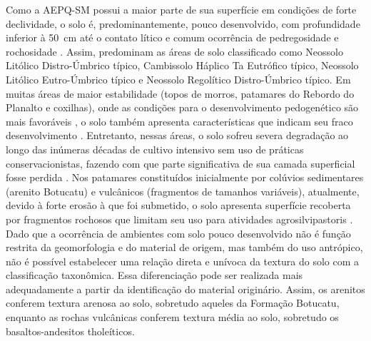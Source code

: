 \documentclass[final]{article}
\begin{document}

Como a AEPQ-SM possui a maior parte de sua superfície em condições de forte declividade, o solo é, predominantemente, pouco desenvolvido, com profundidade inferior à 50~cm até o contato lítico e comum ocorrência de pedregosidade e rochosidade \cite{Miguel2010}. Assim, predominam as áreas de solo classificado como Neossolo Litólico Distro-Úmbrico típico, Cambissolo Háplico Ta Eutrófico típico, Neossolo Litólico Eutro-Úmbrico típico e Neossolo Regolítico Distro-Úmbrico típico. Em muitas áreas de maior estabilidade (topos de morros, patamares do Rebordo do Planalto e coxilhas), onde as condições para o desenvolvimento pedogenético são mais favoráveis \cite{Moser1990}, o solo também apresenta características que indicam seu fraco desenvolvimento \cite{MouraBueno2012}. Entretanto, nessas áreas, o solo sofreu severa degradação ao longo das inúmeras décadas de cultivo intensivo sem uso de práticas conservacionistas, fazendo com que parte significativa de sua camada superficial fosse perdida \cite{SamuelRosaEtAl2011a}. Nos patamares constituídos inicialmente por colúvios sedimentares (arenito Botucatu) e vulcânicos (fragmentos de tamanhos variáveis), atualmente, devido à forte erosão à que foi submetido, o solo apresenta superfície recoberta por fragmentos rochosos que limitam seu uso para atividades agrosilvipastoris \cite{MouraBueno2012}. Dado que a ocorrência de ambientes com solo pouco desenvolvido não é função restrita da geomorfologia e do material de origem, mas também do uso antrópico, não é possível estabelecer uma relação direta e unívoca da textura do solo com a classificação taxonômica. Essa diferenciação pode ser realizada mais adequadamente a partir da identificação do material originário. Assim, os arenitos conferem textura arenosa ao solo, sobretudo aqueles da Formação Botucatu, enquanto as rochas vulcânicas conferem textura média ao solo, sobretudo os basaltos-andesitos tholeíticos.
\end{document}
